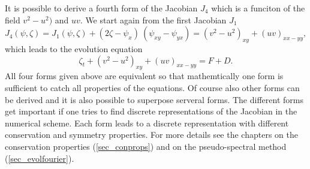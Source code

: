 It is possible to derive a fourth form of the Jacobian $J_{4}$
which is a funciton of the field $v^{2} - u^{2})$ and 
$uv$. We start again from the first Jacobian $J_{1}$
\begin{equation} \label{eq_Jacobi4}
  J_{4}(\psi,\zeta) 
   = 
  J_{1}(\psi,\zeta) + 
   \left(2 \zeta - \psi_{x} \right) \ \left( \psi_{xy} - \psi_{yx} \right)
   = 
  \left(v^{2} - u^{2} \right)_{xy}  
   + 
  \left(uv \right)_{xx-yy},
\end{equation}
which leads to the evolution equation
\begin{equation} \label{eq_2DJacobi4}
  \zeta_{t}+ \left( v^{2} - u^{2} \right)_{xy} + \left( uv \right)_{xx - yy} 
   = 
  F + D.
\end{equation}
All four forms given above are equivalent so that mathemtically one form is
sufficient to catch all properties of the equations. Of course also other
forms can be derived and it is also possible to superpose serveral forms.   
The different forms get important if one tries to find discrete 
representations of the Jacobian in the numerical scheme. Each form leads 
to a discrete representation with different conservation and symmetry 
properties. For more details see the chapters on the conservation 
properties (\ref{sec_conprops}) and on the pseudo-spectral method 
(\ref{sec_evolfourier}). 
%
